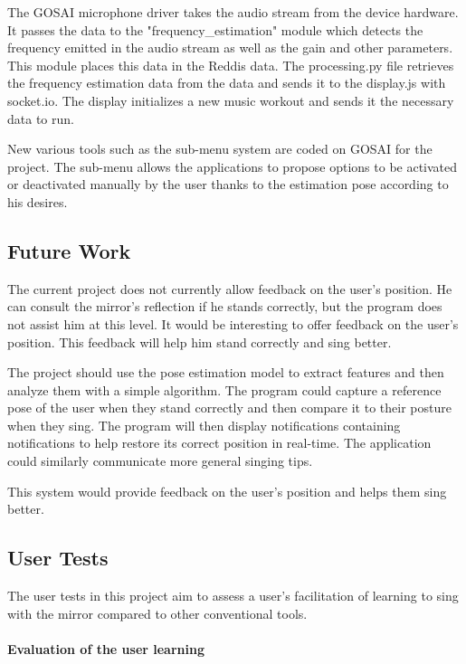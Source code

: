 The GOSAI microphone driver takes the audio stream from the device hardware. It passes the data to the "frequency\_estimation" module which detects the frequency emitted in the audio stream as well as the gain and other parameters. This module places this data in the Reddis data. The processing.py file retrieves the frequency estimation data from the data and sends it to the display.js with socket.io. The display initializes a new music workout and sends it the necessary data to run.

New various tools such as the sub-menu system are coded on GOSAI for the project. The sub-menu allows the applications to propose options to be activated or deactivated manually by the user thanks to the estimation pose according to his desires.

\subsection{Future Work}

The current project does not currently allow feedback on the user's position. He can consult the mirror's reflection if he stands correctly, but the program does not assist him at this level. It would be interesting to offer feedback on the user's position. This feedback will help him stand correctly and sing better. 

The project should use the pose estimation model to extract features and then analyze them with a simple algorithm. The program could capture a reference pose of the user when they stand correctly and then compare it to their posture when they sing. The program will then display notifications containing notifications to help restore its correct position in real-time. The application could similarly communicate more general singing tips. 

This system would provide feedback on the user's position and helps them sing better.

\subsection{User Tests}

The user tests in this project aim to assess a user’s facilitation of learning to sing with the
mirror compared to other conventional tools.

\paragraph{Evaluation of the user learning}

